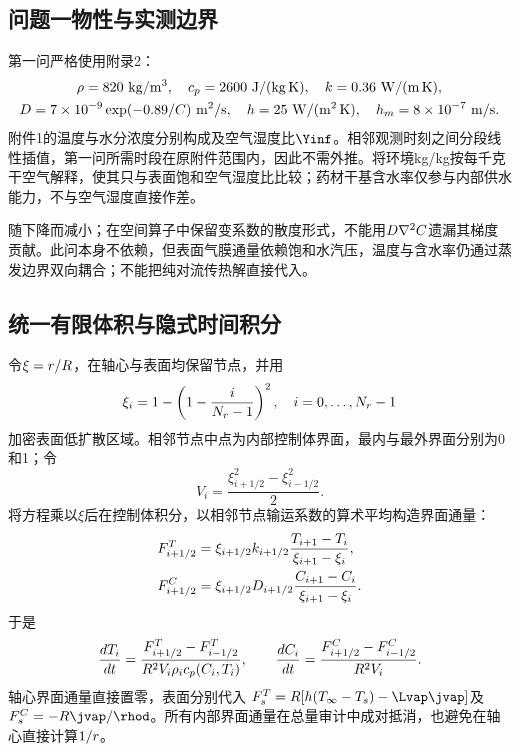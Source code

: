 \subsection{问题一物性与实测边界}
第一问严格使用附录2：
\begin{gather}
\rho=820~\mathrm{kg/m^3},\quad c_p=2600~\mathrm{J/(kg\,K)},\quad
k=0.36~\mathrm{W/(m\,K)},\label{eq:appendix2}\\
D=7\times10^{-9}\exp(-0.89/C)~\mathrm{m^2/s},\quad
h=25~\mathrm{W/(m^2\,K)},\quad h_m=8\times10^{-7}~\mathrm{m/s}.
\end{gather}
附件1的温度与水分浓度分别构成\Tinf{}及空气湿度比$\Yinf$。相邻观测时刻之间分段线性插值，第一问所需时段在原附件范围内，因此不需外推。将环境kg/kg按每千克干空气解释，使其只与表面饱和空气湿度比比较；药材干基含水率仅参与内部供水能力，不与空气湿度直接作差。

\Ddiff{}随\C{}下降而减小；在空间算子中保留变系数的散度形式，不能用$D\nabla^2C$遗漏其梯度贡献。此问\Ddiff{}本身不依赖\T，但表面气膜通量依赖饱和水汽压，温度与含水率仍通过蒸发边界双向耦合；不能把纯对流传热解直接代入。

\subsection{统一有限体积与隐式时间积分}
令$\xi=r/R$，在轴心与表面均保留节点，并用
\begin{equation}
\xi_i=1-\left(1-\frac{i}{N_r-1}\right)^2,\quad i=0,\ldots,N_r-1
\end{equation}
加密表面低扩散区域。相邻节点中点为内部控制体界面，最内与最外界面分别为0和1；令
\begin{equation}
V_i=\frac{\xi_{i+1/2}^2-\xi_{i-1/2}^2}{2}.
\end{equation}
将方程乘以$\xi$后在控制体积分，以相邻节点输运系数的算术平均构造界面通量：
\begin{align}
F^T_{i+1/2}&=\xi_{i+1/2}k_{i+1/2}
\frac{T_{i+1}-T_i}{\xi_{i+1}-\xi_i},\\
F^C_{i+1/2}&=\xi_{i+1/2}D_{i+1/2}
\frac{C_{i+1}-C_i}{\xi_{i+1}-\xi_i}.
\end{align}
于是
\begin{equation}
\frac{dT_i}{dt}=\frac{F^T_{i+1/2}-F^T_{i-1/2}}{R^2V_i\rho_ic_p(C_i,T_i)},\qquad
\frac{dC_i}{dt}=\frac{F^C_{i+1/2}-F^C_{i-1/2}}{R^2V_i}.\label{eq:fvm}
\end{equation}
轴心界面通量直接置零，表面分别代入
$F^T_s=\R[\hconv(\Tinf-\T_s)-\Lvap\jvap]$及
$F^C_s=-\R\jvap/\rhod$。所有内部界面通量在总量审计中成对抵消，也避免在轴心直接计算$1/r$。

